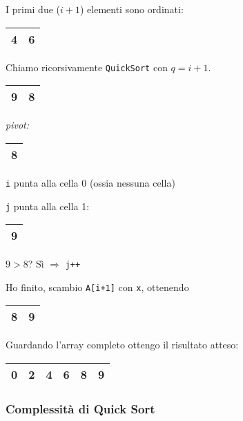 I primi due ($i+1$) elementi sono ordinati: 
\begin{center}
	\begin{tabular}{|l|l|}
		\hline
		4 & 6 \\
		\hline
	\end{tabular}
\end{center}

Chiamo ricorsivamente \texttt{QuickSort} con $q = i + 1$.

\begin{center}
	\begin{tabular}{|l|l|}
		\hline
		9 & 8 \\
		\hline
	\end{tabular}
	\hspace{1cm}
	\emph{pivot: }
	\begin{tabular}{|l|}
		\hline
		8 \\
		\hline
	\end{tabular}
\end{center}

\texttt{i} punta alla cella 0 (ossia nessuna cella) \par
\texttt{j} punta alla cella 1:
\begin{tabular}{|l|}
	\hline
	9 \\
	\hline
\end{tabular}

$9 > 8$? Sì $\Rightarrow$ \texttt{j++} \par
Ho finito, scambio \texttt{A[i+1]} con \texttt{x}, ottenendo \par
\begin{center}
	\begin{tabular}{|l|l|}
		\hline
		8 & 9 \\
		\hline
	\end{tabular}
\end{center}

Guardando l'array completo ottengo il risultato atteso:
\begin{center}
	\begin{tabular}{|l|l|l|l|l|l|}
		\hline
		0 & 2 & 4 & 6 & 8 & 9 \\
		\hline
	\end{tabular}
\end{center}

\subsubsection{Complessità di Quick Sort}

